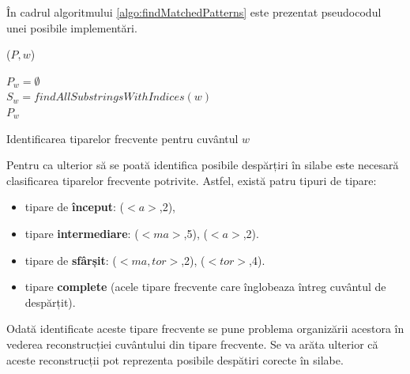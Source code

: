 În cadrul algoritmului \ref{algo:findMatchedPatterns} este prezentat pseudocodul unei posibile implementări.

\begin{algorithm}[H]
\vspace{.5cm}
\SetAlgoLined
{}

\ppg($P, w$) \\

$P_w = \emptyset$ \\
$S_w = findAllSubstringsWithIndices(w)$ \\
\KwRet $P_w$
\caption{Identificarea tiparelor frecvente pentru cuvântul $w$}
\label{algo:findMatchedPatterns}
\vspace{.5cm}
\end{algorithm}
\vspace{1cm}

Pentru ca ulterior să se poată identifica posibile despărțiri în silabe este necesară clasificarea tiparelor frecvente potrivite. Astfel, există patru tipuri de tipare:  

\begin{itemize}
\item tipare de \textbf{început}: ($<a>$,2),
\item tipare \textbf{intermediare}: ($<ma>$,5), ($<a>$,2).
\item tipare de \textbf{sfârșit}: ($<ma, tor>$,2), ($<tor>$,4).  
\item tipare \textbf{complete} (acele tipare frecvente care înglobeaza întreg cuvântul de despărțit).
\end{itemize}



Odată identificate aceste tipare frecvente se pune problema organizării acestora în vederea reconstrucției cuvântului din tipare frecvente. Se va arăta ulterior că aceste reconstrucții pot reprezenta posibile despătiri corecte în silabe. 

